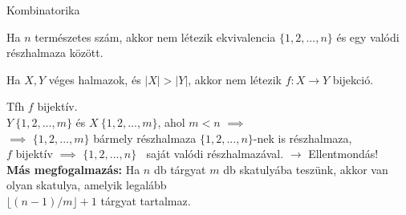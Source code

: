 \documentclass{beamer}
\newcommand{\mmedskip}{\vspace{0.5em}}
\begin{document}
\begin{frame}[plain]
\begin{tcolorbox}[center, colback={myyellow}, coltext={black}, colframe={myyellow}]
    {\Huge Kombinatorika}
    \mmedskip
\end{tcolorbox}
\end{frame}

\begin{frame}

\begin{tcolorbox}[title={Def.: Halmazok ekvivalenciája}]
\end{tcolorbox}

\begin{tcolorbox}[title={Tétel: Véges halmaz valódi részhalmaza}]
Ha $n$ természetes szám, akkor nem létezik ekvivalencia $\{1, 2, ..., n\}$ és egy valódi részhalmaza között.
\end{tcolorbox}
\end{frame}

\begin{frame}
\begin{tcolorbox}[title={Tétel: Skatulya-elv}]
Ha $X, Y$ véges halmazok, és $|X| > |Y|$, akkor nem létezik $f: X \rightarrow Y$ bijekció.
\end{tcolorbox}

\begin{tcolorbox}[title={Bizonyítás (Indirekt)}]
Tfh $f$ bijektív.\\
$Y ~ \{1, 2, ..., m\}$ és $X ~ \{1, 2, ..., m\}$, ahol $m < n$ $\implies$\\
$\implies$ $\{1, 2, ..., m\}$ bármely részhalmaza $\{1, 2, ..., n\}$-nek is részhalmaza,\\
$f$ bijektív $\implies$ $\{1, 2, ..., n\}$ $~$ saját valódi részhalmazával. $\rightarrow$ Ellentmondás!\\
\bigskip
\textbf{Más megfogalmazás:} Ha $n$ db tárgyat $m$ db skatulyába teszünk, akkor van olyan skatulya, amelyik legalább\\
$\lfloor (n - 1) / m \rfloor + 1$ tárgyat tartalmaz.
\end{tcolorbox}
\end{frame}
\end{document}
